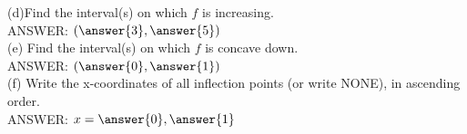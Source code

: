 \documentclass{ximera}
\begin{document}
\begin{exercise}
(d)Find the interval(s) on which $f$ is increasing.\\ 

ANSWER: $(\answer{3},\answer{5})$\\

(e) Find the interval(s) on which $f$ is concave down. \\

ANSWER: $(\answer{0},\answer{1})$\\

(f) Write the x-coordinates of all inflection points (or write NONE), in ascending order.\\

 ANSWER: $x=\answer{0},\answer{1}$\\
\end{exercise}

\end{document}
